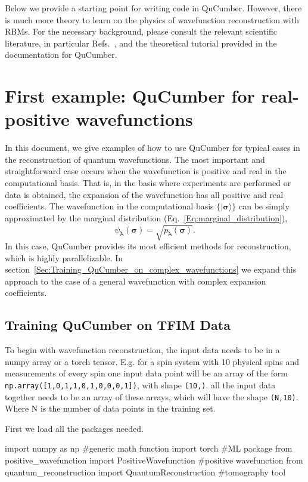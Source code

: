 \documentclass[submission, Phys]{SciPost}
\begin{document}
Below we provide a starting point for writing code in QuCumber.  However, there is much more theory to learn on the physics of wavefunction reconstruction with RBMs. For the necessary background, please consult the relevant scientific literature, in particular Refs.~\cite{Torlai2016thermo, torlai2018tomography, CarleoTroyer2017Science}, and the theoretical tutorial provided in the documentation for QuCumber.  


\section{First example: QuCumber for real-positive wavefunctions}

In this document, we give examples of how to use QuCumber for typical cases in the reconstruction of quantum wavefunctions.  
The most important and straightforward case occurs when the wavefunction is positive and real in the computational basis.  That is, in the basis where experiments are performed or data is obtained, the expansion of the wavefunction has all positive and real coefficients.  The wavefunction in the computational basis $\{ \vert\bm{\sigma}\rangle \}$ can be simply approximated by the marginal distribution (Eq.~\ref{Eq:marginal_distribution}), 
\begin{equation}
\psi_{\bm{\lambda}}(\bm{\sigma}) = \sqrt{p_{\bm{\lambda}} ( \bm{\sigma})}.  \label{PDwavef}
\end{equation}
In this case, QuCumber provides its most efficient methods for reconstruction, which is highly parallelizable.  In section~\ref{Sec:Training_QuCumber_on_complex_wavefunctions} we expand this approach to the case of a general wavefunction with complex expansion coefficients.

\subsection{Training QuCumber on TFIM Data}
\label{Sec:Training_TFIM}

To begin with wavefunction reconstruction, the input data needs to be in a numpy array or a torch tensor. E.g. for a spin system with 10 physical spins and measurements of every spin one input data point will be an array of the form \verb|np.array([1,0,1,1,0,1,0,0,0,1])|, with shape \verb|(10,)|. all the input data together needs to be an array of these arrays, which will have the shape \verb|(N,10)|. Where N is the number of data points in the training set.

First we load all the packages needed. 
\begin{python}
import numpy as np 		#generic math function
import torch 			#ML package
from positive_wavefunction import PositiveWavefunction #positive wavefunction
from quantum_reconstruction import QuantumReconstruction #tomography tool
\end{python} 
\end{document}
